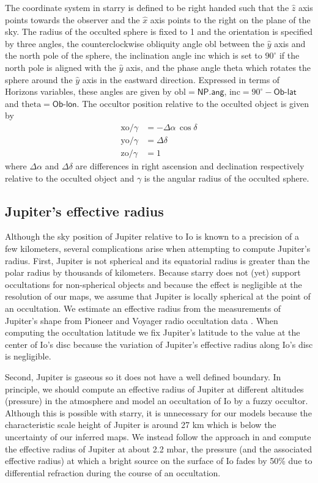 \documentclass[linenumbers,modern]{aastex62}
\begin{document}
The coordinate system in \textsf{starry} is defined to be right handed such that the $\hat{z}$
axis points towards the observer and the $\hat{x}$ axis points to the right on the plane of the sky.
The radius of the occulted sphere is fixed to 1 and the orientation is specified by three angles,
the counterclockwise obliquity angle \textsf{obl} between the $\hat{y}$ axis and the north pole of the sphere, the inclination angle \textsf{inc} which is set to $90^\circ$ if the north pole is aligned with the $\hat{y}$ axis, and the phase angle \textsf{theta} which rotates the sphere around the $\hat{y}$ axis in the eastward direction.
Expressed in terms of Horizons variables, these angles are given by $\mathrm{obl}=\textsf{NP.ang}$, $\mathrm{inc}=90^\circ-\textsf{Ob-lat}$ and $\mathrm{theta}=\textsf{Ob-lon}$.
The occultor position relative to the occulted object is given by
\begin{align}
    \mathrm{xo}/\gamma&=-\Delta\alpha\,\cos\delta\\
    \mathrm{yo}/\gamma&=\Delta\delta\\
    \mathrm{zo}/\gamma&=1
\end{align}
where $\Delta\alpha$ and $\Delta\delta$ are differences in right ascension and declination respectively relative to the occulted object and $\gamma$ is the angular radius of the occulted sphere.

\subsection{Jupiter's effective radius}
\label{ssec:effective_radius}
Although the sky position of Jupiter relative to Io is known to a precision of a few kilometers, several complications arise when attempting to compute Jupiter's radius.
First, Jupiter is not spherical and its equatorial radius is greater than the polar radius by thousands of kilometers. 
Because \textsf{starry} does not (yet) support occultations for non-spherical objects and because the effect is negligible at the resolution of our maps, we assume that Jupiter is locally spherical at the point of an occultation. 
We estimate an effective radius from the measurements of Jupiter's shape from Pioneer and Voyager radio occultation data \citep[Fig.~7 of][]{lindal1981}.
When computing the occultation latitude we fix Jupiter's latitude to the value at the center of Io's disc because 
the variation of Jupiter's effective radius along Io's disc is negligible.

Second, Jupiter is gaseous so it does not have a well defined boundary.
In principle, we should compute an effective radius of Jupiter at different altitudes (pressure) in the atmosphere and model an occultation of Io by a fuzzy occultor.
Although this is possible with \textsf{starry}, it is unnecessary for our models because the characteristic scale height of Jupiter is around 27 km  which is below the uncertainty of our inferred maps.
We instead follow the approach in \cite{spencer1990} and compute the effective radius of Jupiter at about 2.2 mbar, the pressure (and the associated effective radius) at which a  bright source on the surface of Io fades by 50\% due to differential refraction during the course of an occultation.
\end{document}
